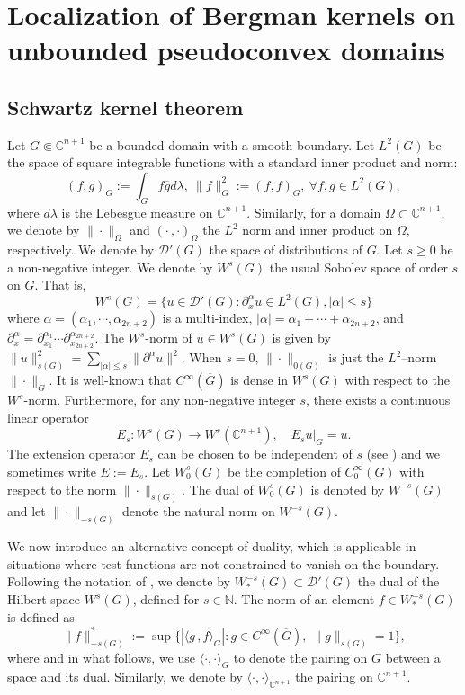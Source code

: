 \documentclass[a4paper,centertags,oneside,12pt]{amsart}
\numberwithin{equation}{section}
\begin{document}
\section{Localization of Bergman kernels on  unbounded pseudoconvex domains}
\subsection{Schwartz kernel theorem}
Let $G\Subset\mathbb C^{n+1}$ be a  bounded domain with a smooth boundary. Let $L^2(G)$ be the space of square integrable functions with a standard inner product and norm:
\begin{equation*}\label{e-gue260309yyd}
(f, g)_G:=\int_{G}f\overline g d\lambda,~ \|f\|_G^2:=(f,f)_G, ~\forall f, g\in L^2(G),\end{equation*}
where $d\lambda$ is the Lebesgue measure on $\mathbb C^{n+1}$. Similarly, for a domain $\Omega \subset \mathbb C^{n+1}$, we denote by $\|\cdot\|_{\Omega}$ and $(\cdot\,,\cdot)_{\Omega}$ the $L^2$ norm and inner product on $\Omega$, respectively.
We denote by $\mathcal D'(G)$ the space of distributions of $G$.
Let $s\geq0$ be a non-negative integer.  We denote by $W^s(G)$ the usual Sobolev space of order $s$ on $G$. That is, $$W^s(G)=\{u\in\mathcal D'(G): \partial_x^\alpha u\in L^2(G), |\alpha|\leq s\}$$ where $\alpha=(\alpha_1, \cdots, \alpha_{2n+2})$ is a multi-index,  $|\alpha|=\alpha_1+\cdots+\alpha_{2n+2}$, and $\partial_x^\alpha=\partial^{\alpha_1}_{x_1}\cdots\partial^{\alpha_{2n+2}}_{x_{2n+2}}$. The $W^s$-norm of $u\in W^s(G)$  is given by  $\|u\|_{s(G)}^2=\sum_{|\alpha|\leq s}\|\partial^\alpha u\|^2$. When $s=0$, $\|\cdot\|_{0(G)}$ is just the $L^2$--norm $\|\cdot\|_G$. It is well-known that $C^\infty(\overline G)$ is dense in $W^s(G)$ with respect to the $W^s$-norm. Furthermore, for any non-negative integer $s$, there exists a continuous linear operator 
\begin{equation}\label{e-gue260305yyd}
E_s: W^s(G)\rightarrow W^s(\mathbb C^{n+1}), \quad E_s u|_{G}=u.\end{equation} 
The extension operator $E_s$ can be chosen to be independent of $s$ (see \cite{St70}) and we sometimes write $E:=E_s$.  Let $W_0^s(G)$ be the completion of $C_0^\infty(G)$ with respect to the norm $\|\cdot\|_{s(G)}$. 
The dual of $W_0^s(G)$ is denoted by $W^{-s}(G)$ and let $\|\cdot\|_{-s(G)}$ denote the natural norm on $W^{-s}(G)$. 

We now introduce an alternative concept of duality, which is applicable in situations where test functions are not constrained to vanish on the boundary. Following the notation of \cite{Bo87a}, we denote by $W_{\ast}^{-s}(G)\subset\mathcal{D}'(G)$ the dual of the Hilbert  space $W^{s}(G)$, defined for $s \in \mathbb{N}$. 
The norm of an element $f \in W_{\ast}^{-s}(G)$ is defined as
\begin{equation*}
\|f\|^\ast_{-s(G)} 
:= \sup \bigl\{ | \langle g\,, f \rangle_G | : g \in C^{\infty}(\overline{G}),\; \|g\|_{s(G)} = 1 \bigr\},
\end{equation*}
where and in what follows, we use $\langle \cdot, \cdot \rangle_G$ to denote
the pairing on $G$ between a space and its dual. Similarly, we denote by $\langle \cdot, \cdot \rangle_{\mathbb C^{n+1}}$ the pairing on $\mathbb C^{n+1}$.
\end{document}
